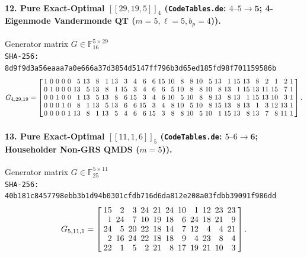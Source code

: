 \documentclass[11pt,a4paper]{article}
\theoremstyle{remark}
\begin{document}
\paragraph{12. Pure Exact-Optimal $[[29,19,5]]_{4}$ (\texttt{CodeTables.de}: $4\text{--}5 \to \mathbf{5}$; 4-Eigenmode Vandermonde QT ($m=5, \ell=5, b_p=4$)).} Generator matrix $G \in \mathbb{F}_{16}^{5 \times 29}$\\
{\footnotesize\texttt{SHA-256: 8d9f9d3a56eaaa7a0e666a37d3854d5147ff796b3d65ed185fd98f701159586b}}
{\scriptsize\[
G_{4,29,19} = \setlength{\arraycolsep}{1.70pt}\renewcommand{\arraystretch}{0.95}
\left[\begin{array}{*{29}{r}}
1 & 0 & 0 & 0 & 0 & 5 & 13 & 8 & 1 & 13 & 3 & 4 & 6 & 6 & 15 & 10 & 8 & 8 & 10 & 5 & 13 & 1 & 15 & 13 & 8 & 2 & 1 & 2 & 1 \\
0 & 1 & 0 & 0 & 0 & 13 & 5 & 13 & 8 & 1 & 15 & 3 & 4 & 6 & 6 & 5 & 10 & 8 & 8 & 10 & 8 & 13 & 1 & 15 & 13 & 11 & 15 & 7 & 1 \\
0 & 0 & 1 & 0 & 0 & 1 & 13 & 5 & 13 & 8 & 6 & 15 & 3 & 4 & 6 & 10 & 5 & 10 & 8 & 8 & 13 & 8 & 13 & 1 & 15 & 13 & 10 & 3 & 1 \\
0 & 0 & 0 & 1 & 0 & 8 & 1 & 13 & 5 & 13 & 6 & 6 & 15 & 3 & 4 & 8 & 10 & 5 & 10 & 8 & 15 & 13 & 8 & 13 & 1 & 3 & 12 & 13 & 1 \\
0 & 0 & 0 & 0 & 1 & 13 & 8 & 1 & 13 & 5 & 4 & 6 & 6 & 15 & 3 & 8 & 8 & 10 & 5 & 10 & 1 & 15 & 13 & 8 & 13 & 7 & 8 & 11 & 1
\end{array}\right].
\]}

\paragraph{13. Pure Exact-Optimal $[[11,1,6]]_{5}$ (\texttt{CodeTables.de}: $5\text{--}6 \to \mathbf{6}$; Householder Non-GRS QMDS ($m=5$)).} Generator matrix $G \in \mathbb{F}_{25}^{5 \times 11}$\\
{\footnotesize\texttt{SHA-256: 40b181c8457798ebb3b1d94b0301cfdb716d6da812e208a03fdbb39091f986dd}}
{\scriptsize\[
G_{5,11,1} = \setlength{\arraycolsep}{2.5pt}\renewcommand{\arraystretch}{0.95}
\left[\begin{array}{*{11}{r}}
15 & 2 & 3 & 24 & 21 & 24 & 10 & 1 & 12 & 23 & 23 \\
1 & 24 & 7 & 10 & 19 & 18 & 6 & 24 & 18 & 21 & 9 \\
24 & 5 & 20 & 22 & 18 & 14 & 7 & 12 & 4 & 4 & 21 \\
2 & 16 & 24 & 22 & 18 & 18 & 9 & 4 & 23 & 8 & 4 \\
22 & 1 & 5 & 2 & 21 & 8 & 17 & 19 & 21 & 10 & 3
\end{array}\right].
\]}
\end{document}
